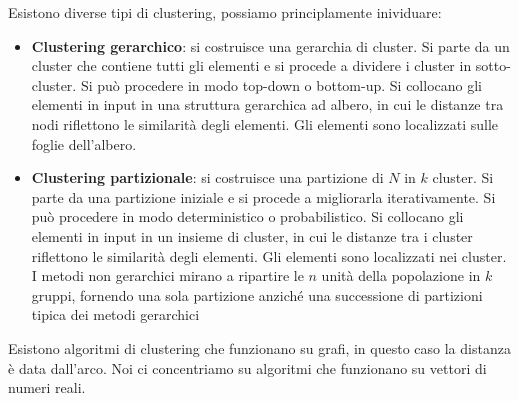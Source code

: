 Esistono diverse tipi di clustering, possiamo principlamente inividuare:
\begin{itemize}
    \item \textbf{Clustering gerarchico}: si costruisce una gerarchia di cluster. Si parte da un cluster che contiene tutti gli elementi e si procede a dividere i cluster in sotto-cluster. Si può procedere in modo top-down o bottom-up. Si collocano gli elementi in input in una struttura gerarchica ad albero, in cui le distanze tra nodi riflettono le similarità degli elementi. Gli elementi sono localizzati sulle foglie dell'albero.
    \item \textbf{Clustering partizionale}: si costruisce una partizione di $N$ in $k$ cluster. Si parte da una partizione iniziale e si procede a migliorarla iterativamente. Si può procedere in modo deterministico o probabilistico. Si collocano gli elementi in input in un insieme di cluster, in cui le distanze tra i cluster riflettono le similarità degli elementi. Gli elementi sono localizzati nei cluster. I metodi non gerarchici mirano a ripartire le $n$ unità della popolazione in $k$ gruppi, fornendo una sola partizione anziché una successione di partizioni tipica dei metodi gerarchici
\end{itemize}
Esistono algoritmi di clustering che funzionano su grafi, in questo caso la distanza è data dall'arco. Noi ci concentriamo su algoritmi che funzionano su vettori di numeri reali.
